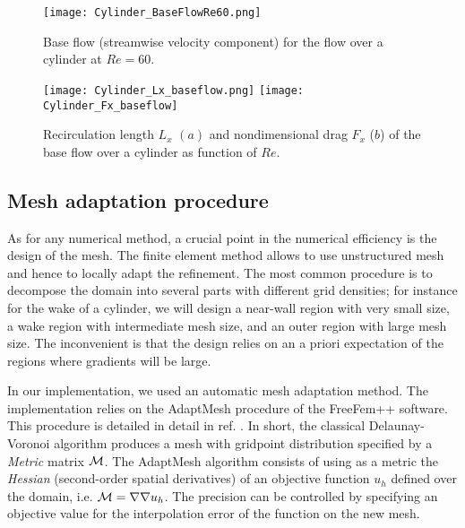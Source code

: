 \documentclass[twocolumn,10pt]{asme2ej}
\begin{document}
\begin{figure}
\texttt{[image: Cylinder\_BaseFlowRe60.png]}
\caption{Base flow (streamwise velocity component) for the flow over a cylinder at $Re=60$.}
\label{fig:Baseflow}
\end{figure}

\begin{figure}
\texttt{[image: Cylinder\_Lx\_baseflow.png]}
\texttt{[image: Cylinder\_Fx\_baseflow]}
\caption{Recirculation length $L_x$ $(a)$  and nondimensional drag $F_x$ ($b$) of the base flow over a cylinder as function of $Re$.}
\label{fig:LxandDrag}
\end{figure}




\subsection{Mesh adaptation procedure}
\vspace{.2cm}

As for any numerical method, a crucial point in the numerical efficiency is the design of the mesh. The finite element method allows to use unstructured mesh and hence to locally adapt the refinement. %
The most common procedure is to decompose the domain into several parts with different grid densities; for instance for the wake of a cylinder, we will design a near-wall region with very small  size, a wake region with intermediate mesh size, and an outer region with large mesh size. The inconvenient is that the design relies on an a priori expectation of the regions where gradients will be large. 

In our implementation, we used an automatic mesh adaptation method. %
The implementation relies on the AdaptMesh procedure of the FreeFem++ software. This procedure is detailed in detail in ref. \cite{adapt}. 
In short, the classical Delaunay-Voronoi algorithm produces a mesh with gridpoint distribution specified by a {\em Metric } matrix $\cal M$. The AdaptMesh algorithm consists of using as a metric the {\em Hessian} (second-order spatial derivatives) of an objective function $u_h$ defined over the domain, i.e. ${\cal M} = \nabla \nabla u_h$. The precision can be controlled by specifying an objective value for the interpolation error of the function on the new mesh.
\end{document}
